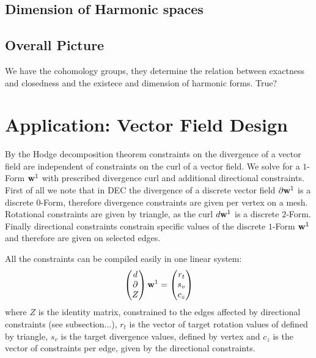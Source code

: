 \subsection{Dimension of Harmonic spaces}

\subsection{Overall Picture}
We have the cohomology groups, they determine the relation between exactness and closedness and the existece and dimension of harmonic forms. True?

\section{Application: Vector Field Design}

 By the Hodge decomposition theorem constraints on the divergence of a vector field are independent of constraints on the curl of a vector field. We solve for a $1$-Form $\textbf{w}^1$ with prescribed divergence curl and additional directional constraints.
First of all we note that in DEC the divergence of a discrete vector field $\partial \textbf{w}^1$ is a discrete $0$-Form, therefore divergence constraints are given per vertex on a mesh. Rotational constraints are given by triangle, as the curl $d\textbf{w}^1$ is a discrete $2$-Form. Finally directional constraints constrain specific values of the discrete $1$-Form $\textbf{w}^1$ and therefore are given on selected edges.

All the constraints can be compiled easily in one linear system:
\begin{equation}\begin{pmatrix} d \\
\partial \\
Z
\end{pmatrix} \textbf{w}^1
= \begin{pmatrix}
r_t \\
s_v \\
c_z
\end{pmatrix} \label{eq:vfdesign1}
\end{equation}
where $Z$ is the identity matrix, constrained to the edges  affected by directional constraints (see subsection...), $r_t$ is the vector of target rotation values of defined by triangle, $s_v$ is the  target divergence values, defined by vertex and $c_z$ is the vector of constraints per edge, given by the directional constraints.


